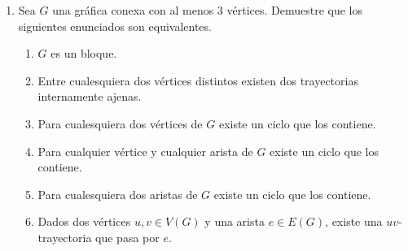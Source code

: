 \documentclass{article}
\begin{document}
\begin{enumerate}
\begin{proof}
    De igual forma existira algun $b_r$ para alguna r que pertenece a los naturales, tal que $b_r \in$ X,
    pero $b_{r+1} \notin $ X por lo que ahora  Q'$=(x' =b_r, b_{r+1}, b_{r+2}, ..., b_k = y')$.

    Ahora definamos $P'^{-1}$ como $(y'=a_n, a_{n-1}, a_{n-2}, ..., a_i=x')$ y $Q'^{-1}$ como
    $(y'=b_k, b_{k-1}, b_{k-2}, ..., b_r=x') \Leftrightarrow$ aplicando el razonamiento anterior,
    existira t que pertenenzca los naturales, tal que $b_{k-t} \in Y$ y $b_{k-(t+1)} \notin Y$
    y de igual forma existiara s que pertenezca a los naturales tal que $a_{n-s} \in Y$ y
    $a_{n-(s+1)} \notin Y \Leftrightarrow$ definamos a $P=(a_i, a_{i+1}, ...., a_{n-s})$ y definimos
    a $Q=(b_j, b_{j+1}, ..., b_{k-t})$

    Por lo tanto:

    a) se cumple ya que $a_i$ y $b_j$ pertenencen a X por construccion de nuetras trayectorias P y Q.

    b) se cumple ya que $a_{n-r}$ y $b_{k-t}$ pertenencen a Y por construccion de P y Q.

    c) se cumple de nuevo por construccion de P y Q y ya que X y Y son conjuntos disjuntos de V
  \end{proof}

\item Sea $G$ una gr\'afica conexa con al menos 3 v\'ertices. Demuestre que
  los siguientes enunciados son equivalentes.
  \begin{enumerate}
  \item $G$ es un bloque.

  \item Entre cualesquiera dos v\'ertices distintos existen dos trayectorias internamente ajenas.

  \item Para cualesquiera dos v\'ertices de $G$ existe un ciclo que los
    contiene.

  \item Para cualquier v\'ertice y cualquier arista de $G$ existe un ciclo
    que los contiene.

  \item Para cualesquiera dos aristas de $G$ existe un ciclo que los
    contiene.

  \item Dados dos v\'ertices $u,v \in V(G)$ y una arista $e \in E(G)$,
    existe una $uv$-trayectoria que pasa por $e$.


\end{enumerate}
\end{enumerate}
\end{document}
